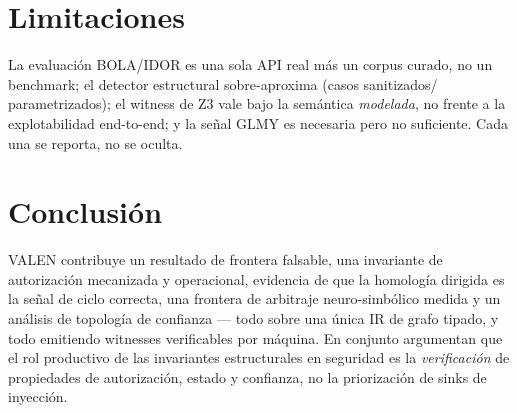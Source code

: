 \documentclass[11pt]{article}
\begin{document}
\section{Limitaciones}
La evaluación BOLA/IDOR es una sola API real más un corpus curado, no un
benchmark; el detector estructural sobre-aproxima (casos sanitizados/
parametrizados); el witness de Z3 vale bajo la semántica \emph{modelada}, no
frente a la explotabilidad end-to-end; y la señal GLMY es necesaria pero no
suficiente. Cada una se reporta, no se oculta.

\section{Conclusión}
VALEN contribuye un resultado de frontera falsable, una invariante de
autorización mecanizada y operacional, evidencia de que la homología dirigida es
la señal de ciclo correcta, una frontera de arbitraje neuro-simbólico medida y un
análisis de topología de confianza --- todo sobre una única IR de grafo tipado, y
todo emitiendo witnesses verificables por máquina. En conjunto argumentan que el
rol productivo de las invariantes estructurales en seguridad es la
\emph{verificación} de propiedades de autorización, estado y confianza, no la
priorización de sinks de inyección.
\end{document}
